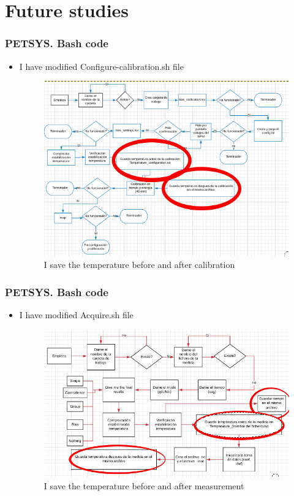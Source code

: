 \documentclass{beamer}
\begin{document}
\section{Future studies}


\begin{frame}
\frametitle{PETSYS. Bash code}
\begin{itemize}
\item{} I have modified Configure-calibration.sh file

\begin{figure}[hbtp]
\centering
\includegraphics[scale=0.4]{PETSYS/Bash_code/Modification_Configure.png}
\caption{I save the temperature before and after calibration}
\end{figure}


\end{itemize}

\end{frame}

\begin{frame}
\frametitle{PETSYS. Bash code}
\begin{itemize}
\item{} I have modified Acquire.sh file

\begin{figure}[hbtp]
\centering
\includegraphics[scale=0.45]{PETSYS/Bash_code/Modification_Acquire.png}
\caption{I save the temperature before and after measurement}
\end{figure}


\end{itemize}

\end{frame}
\end{document}
